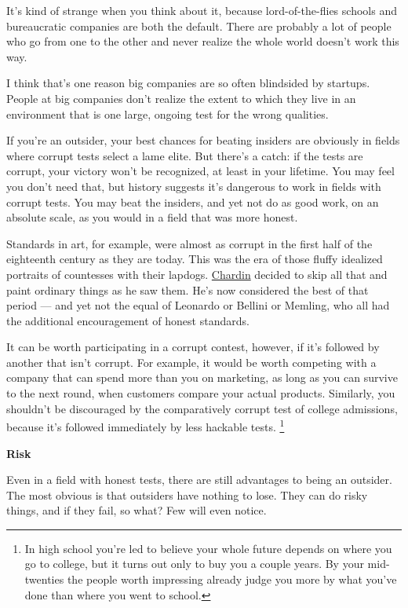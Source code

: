 \documentclass[12pt]{book}
\begin{document}
It's kind of strange when you think about it, because lord-of-the-flies
schools and bureaucratic companies are both the default. There are
probably a lot of people who go from one to the other and never realize
the whole world doesn't work this way.

I think that's one reason big companies are so often blindsided by
startups. People at big companies don't realize the extent to which they
live in an environment that is one large, ongoing test for the wrong
qualities.

If you're an outsider, your best chances for beating insiders are
obviously in fields where corrupt tests select a lame elite. But there's
a catch: if the tests are corrupt, your victory won't be recognized, at
least in your lifetime. You may feel you don't need that, but history
suggests it's dangerous to work in fields with corrupt tests. You may
beat the insiders, and yet not do as good work, on an absolute scale, as
you would in a field that was more honest.

Standards in art, for example, were almost as corrupt in the first half
of the eighteenth century as they are today. This was the era of those
fluffy idealized portraits of countesses with their lapdogs.
\href{largilliere-chardin.html}{Chardin} decided to skip all that and
paint ordinary things as he saw them. He's now considered the best of
that period --- and yet not the equal of Leonardo or Bellini or Memling,
who all had the additional encouragement of honest standards.

It can be worth participating in a corrupt contest, however, if it's
followed by another that isn't corrupt. For example, it would be worth
competing with a company that can spend more than you on marketing, as
long as you can survive to the next round, when customers compare your
actual products. Similarly, you shouldn't be discouraged by the
comparatively corrupt test of college admissions, because it's followed
immediately by less hackable tests. \footnote{In high school you're led to believe your whole future depends
on where you go to college, but it turns out only to buy you a couple
years. By your mid-twenties the people worth impressing already judge
you more by what you've done than where you went to school.}

\textbf{Risk}

Even in a field with honest tests, there are still advantages to being
an outsider. The most obvious is that outsiders have nothing to lose.
They can do risky things, and if they fail, so what? Few will even
notice.
\end{document}
